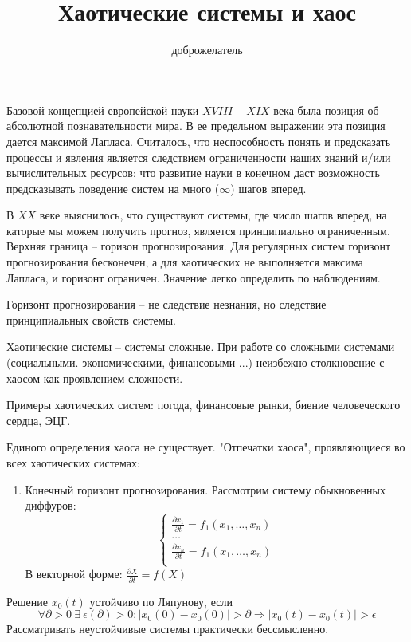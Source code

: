 \documentclass[11pt]{article}
\begin{document}
	
	\author{доброжелатель}
	\title{Хаотические системы и хаос}
	\date{}
	\maketitle
	
	\medskip
	
	Базовой концепцией европейской науки $XVIII-XIX$ века была позиция об абсолютной познавательности мира. В ее предельном выражении эта позиция дается максимой Лапласа. Считалось, что неспособность понять и предсказать процессы и явления является следствием ограниченности наших знаний и/или вычислительных ресурсов; что развитие науки в конечном  даст возможность предсказывать поведение систем на много ($\infty$) шагов вперед.
	
	В $XX$ веке выяснилось, что существуют системы, где число шагов вперед, на каторые мы можем получить прогноз, является принципиально ограниченным. Верхняя граница -- горизон прогнозирования. Для регулярных систем горизонт прогнозирования бесконечен, а для хаотических не выполняется максима Лапласа, и горизонт ограничен. Значение легко определить по наблюдениям.
	
	Горизонт прогнозирования -- не следствие незнания, но следствие принципиальных свойств системы.
	
	Хаотические системы -- системы сложные. При работе со сложными системами (социальными. экономическими, финансовыми ...) неизбежно столкновение с хаосом как проявлением сложности.
	
	Примеры хаотических систем: погода, финансовые рынки, биение человеческого сердца, ЭЦГ.
	
	Единого определения хаоса не существует. "Отпечатки хаоса", проявляющиеся во всех хаотических системах: 
	\begin{enumerate}
		\item Конечный горизонт прогнозирования. Рассмотрим систему обыкновенных диффуров:
		$$\begin{cases}
			\frac{\partial x_1}{\partial t} = f_1 (x_1, \dots, x_n)\\
			\dots\\
			\frac{\partial x_n}{\partial t} = f_1 (x_1, \dots, x_n)\\
		\end{cases}$$
		В векторной форме: $\frac{\partial X}{\partial t} = f(X )$
	\end{enumerate}
	Решение $x_0(t)$ устойчиво по Ляпунову, если $$ \forall \partial>0 \:\exists\: \epsilon(\partial)>0:|x_0(0)-\overline{x_0}(0)|>\partial \Rightarrow |x_0(t)-\overline{x_0}(t)|>\epsilon $$
	Рассматривать неустойчивые системы практически бессмысленно.
	
\end{document}
